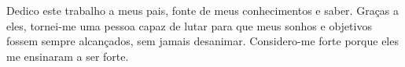 \begin{dedicatoria}
 \vspace*{\fill}
 \noindent
  \raggedleft
 \begin{minipage}{.54\textwidth}
    Dedico este trabalho a meus pais, fonte de meus conhecimentos  e saber. Graças a eles, tornei-me uma pessoa capaz de lutar para que meus sonhos e objetivos fossem sempre alcançados, sem jamais desanimar. Considero-me forte porque eles me ensinaram a ser forte.
   \end{minipage}
\end{dedicatoria}

